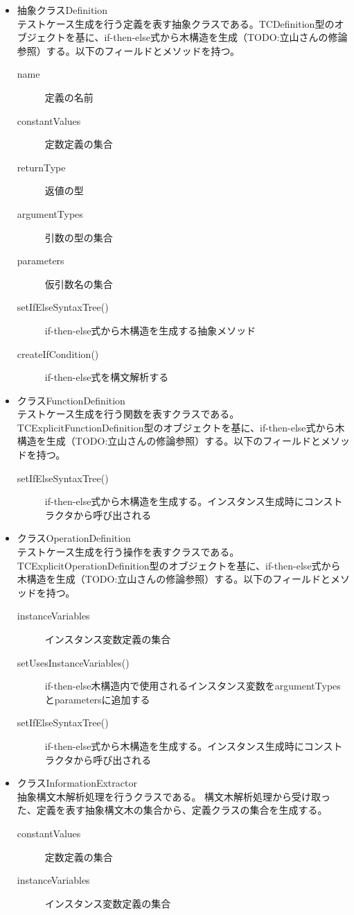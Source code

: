 \documentclass[uplatex, report, a4j, 10pt]{jsbook}
\begin{document}
\begin{itemize}
  \item 抽象クラスDefinition\\
  テストケース生成を行う定義を表す抽象クラスである。TCDefinition型のオブジェクトを基に、if-then-else式から木構造を生成（TODO:立山さんの修論参照）する。以下のフィールドとメソッドを持つ。
  \begin{description}
    \item[name] 定義の名前
    \item[constantValues] 定数定義の集合
    \item[returnType] 返値の型
    \item[argumentTypes] 引数の型の集合 
    \item[parameters] 仮引数名の集合
    \item[setIfElseSyntaxTree()] if-then-else式から木構造を生成する抽象メソッド
    \item[createIfCondition()] if-then-else式を構文解析する
  \end{description}

  \item クラスFunctionDefinition\\
  テストケース生成を行う関数を表すクラスである。TCExplicitFunctionDefinition型のオブジェクトを基に、if-then-else式から木構造を生成（TODO:立山さんの修論参照）する。以下のフィールドとメソッドを持つ。
  \begin{description}
    \item[setIfElseSyntaxTree()] if-then-else式から木構造を生成する。インスタンス生成時にコンストラクタから呼び出される
  \end{description}

  \item クラスOperationDefinition\\
  テストケース生成を行う操作を表すクラスである。TCExplicitOperationDefinition型のオブジェクトを基に、if-then-else式から木構造を生成（TODO:立山さんの修論参照）する。以下のフィールドとメソッドを持つ。
  \begin{description}
    \item[instanceVariables] インスタンス変数定義の集合
    \item[setUsesInstanceVariables()] if-then-else木構造内で使用されるインスタンス変数をargumentTypesとparametersに追加する
    \item[setIfElseSyntaxTree()] if-then-else式から木構造を生成する。インスタンス生成時にコンストラクタから呼び出される
  \end{description}

  \item クラスInformationExtractor\\
  抽象構文木解析処理を行うクラスである。
  構文木解析処理から受け取った、定義を表す抽象構文木の集合から、定義クラスの集合を生成する。
  \begin{description}
    \item[constantValues] 定数定義の集合
    \item[instanceVariables] インスタンス変数定義の集合
  \end{description}

\end{itemize}
\end{document}
